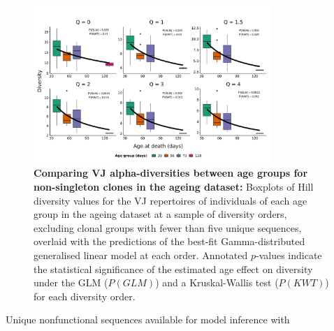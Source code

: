 \begin{figure}
\centering
\includegraphics[width = 0.8\textwidth]{_Figures/png/ageing-VJ-diversity-vlarge-solo-fit-gamma}
\caption[Comparing VJ alpha-diversities between age groups for large clones in the \igseq ageing dataset]{\textbf{Comparing VJ alpha-diversities between age groups for non-singleton clones in the \igseq ageing dataset:} Boxplots of Hill diversity values for the VJ repertoires of individuals of each age group in the \igseq ageing dataset at a sample of diversity orders, excluding clonal groups with fewer than five unique sequences, overlaid with the predictions of the best-fit Gamma-distributed generalised linear model at each order.  Annotated $p$-values indicate the statistical significance of the estimated age effect on diversity under the GLM ($P(GLM)$) and a Kruskal-Wallis test ($P(KWT)$) for each diversity order.}
\label{fig:igseq-ageing-VJ-diversity-large-solo-fit-gamma}
\end{figure}

\begin{table}
\caption{Unique nonfunctional sequences available for model inference with }\label{tab:igseq-ageing-igor-seqs}

\end{table}

